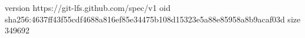 version https://git-lfs.github.com/spec/v1
oid sha256:4637ff43f55cdf4688a816ef85e34475b108d15323e5a88e85958a8b9acaf03d
size 349692
